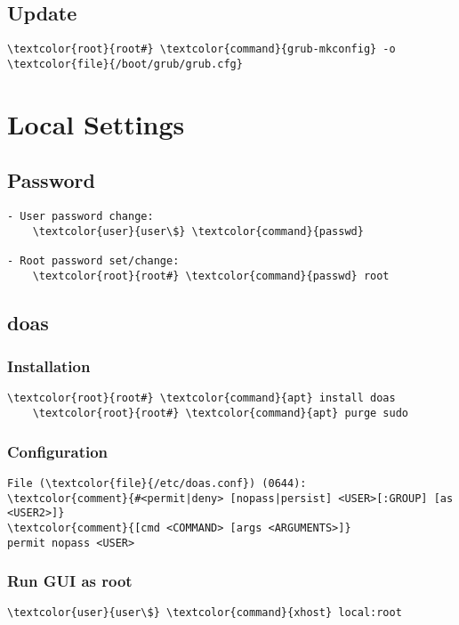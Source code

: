 \documentclass[10pt, a4paper, onecolumn, openany]{book} %
\begin{document}
\section{Update}
\begin{Verbatim}[commandchars=\\\{\}]
    \textcolor{root}{root#} \textcolor{command}{grub-mkconfig} -o \textcolor{file}{/boot/grub/grub.cfg}
\end{Verbatim}


\chapter{Local Settings}
\section{Password}
\begin{Verbatim}[commandchars=\\\{\}]
- User password change:
    \textcolor{user}{user\$} \textcolor{command}{passwd}
   
- Root password set/change: 
    \textcolor{root}{root#} \textcolor{command}{passwd} root
\end{Verbatim}

\section{doas}
\subsection{Installation}
\begin{Verbatim}[commandchars=\\\{\}]
    \textcolor{root}{root#} \textcolor{command}{apt} install doas
    \textcolor{root}{root#} \textcolor{command}{apt} purge sudo
\end{Verbatim}
\subsection{Configuration}
\begin{Verbatim}[commandchars=\\\{\}]
File (\textcolor{file}{/etc/doas.conf}) (0644):
\textcolor{comment}{#<permit|deny> [nopass|persist] <USER>[:GROUP] [as <USER2>]}
\textcolor{comment}{[cmd <COMMAND> [args <ARGUMENTS>]}
permit nopass <USER>
\end{Verbatim}
\subsection{Run GUI as root}
\begin{Verbatim}[commandchars=\\\{\}]
    \textcolor{user}{user\$} \textcolor{command}{xhost} local:root
\end{Verbatim}
\end{document}
